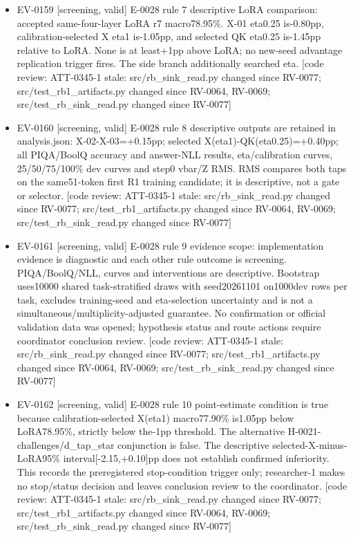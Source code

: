 \documentclass[11pt]{article}
\begin{document}
\begin{itemize}
\item EV-0159 [screening, valid] E-0028 rule 7 descriptive LoRA comparison: accepted same-four-layer LoRA r7 macro78.95\%. X-01 eta0.25 is-0.80pp, calibration-selected X eta1 is-1.05pp, and selected QK eta0.25 is-1.45pp relative to LoRA. None is at least+1pp above LoRA; no new-seed advantage replication trigger fires. The side branch additionally searched eta. [code review: ATT-0345-1 stale: src/rb\_sink\_read.py changed since RV-0077; src/test\_rb1\_artifacts.py changed since RV-0064, RV-0069; src/test\_rb\_sink\_read.py changed since RV-0077]
\item EV-0160 [screening, valid] E-0028 rule 8 descriptive outputs are retained in analysis.json: X-02-X-03=+0.15pp; selected X(eta1)-QK(eta0.25)=+0.40pp; all PIQA/BoolQ accuracy and answer-NLL results, eta/calibration curves, 25/50/75/100\% dev curves and step0 vbar/Z RMS. RMS compares both taps on the same51-token first R1 training candidate; it is descriptive, not a gate or selector. [code review: ATT-0345-1 stale: src/rb\_sink\_read.py changed since RV-0077; src/test\_rb1\_artifacts.py changed since RV-0064, RV-0069; src/test\_rb\_sink\_read.py changed since RV-0077]
\item EV-0161 [screening, valid] E-0028 rule 9 evidence scope: implementation evidence is diagnostic and each other rule outcome is screening. PIQA/BoolQ/NLL, curves and interventions are descriptive. Bootstrap uses10000 shared task-stratified draws with seed20261101 on1000dev rows per task, excludes training-seed and eta-selection uncertainty and is not a simultaneous/multiplicity-adjusted guarantee. No confirmation or official validation data was opened; hypothesis status and route actions require coordinator conclusion review. [code review: ATT-0345-1 stale: src/rb\_sink\_read.py changed since RV-0077; src/test\_rb1\_artifacts.py changed since RV-0064, RV-0069; src/test\_rb\_sink\_read.py changed since RV-0077]
\item EV-0162 [screening, valid] E-0028 rule 10 point-estimate condition is true because calibration-selected X(eta1) macro77.90\% is1.05pp below LoRA78.95\%, strictly below the-1pp threshold. The alternative H-0021-challenges/d\_tap\_star conjunction is false. The descriptive selected-X-minus-LoRA95\% interval[-2.15,+0.10]pp does not establish confirmed inferiority. This records the preregistered stop-condition trigger only; researcher-1 makes no stop/status decision and leaves conclusion review to the coordinator. [code review: ATT-0345-1 stale: src/rb\_sink\_read.py changed since RV-0077; src/test\_rb1\_artifacts.py changed since RV-0064, RV-0069; src/test\_rb\_sink\_read.py changed since RV-0077]

\end{itemize}
\end{document}
